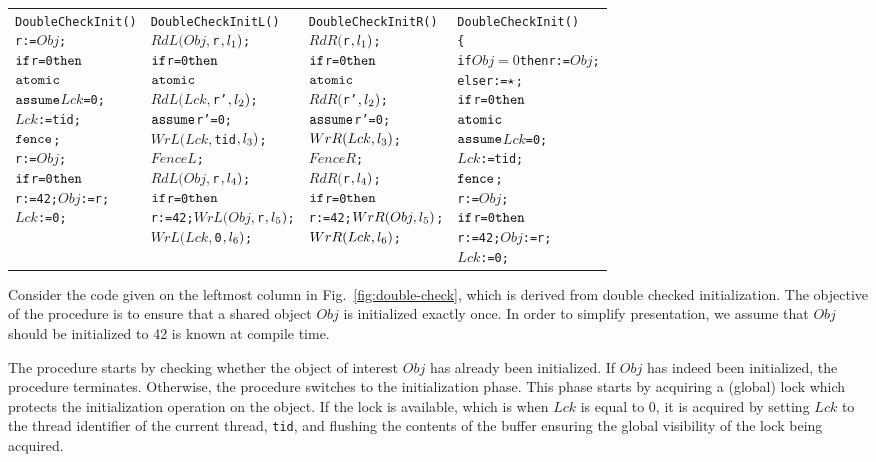 \begin{figure*}[ht]
{\small
\begin{tabular}{p{}|p{}p{}|p{}}
\begin{alltt}DoubleCheckInit() 
 r:=\(Obj\);
 \(\aliif\) r=0 \(\alithen\) 
   \(\aliatomic\)  
     \(\aliassume\) {\(Lck\)=0}; 
     \(Lck\):=tid; 
     \(\alifence\); 
  r:=\(Obj\);
  \(\aliif\) r=0 \(\alithen\) 
    r:=42; \(Obj\):=r;
  \(Lck\):=0;\end{alltt}
&
\begin{alltt}DoubleCheckInitL()
 \(RdL(Obj,\)r\(,l\sb{1})\);
 \(\aliif\) r=0 \(\alithen\) 
   \(\aliatomic\)  
     \(RdL(Lck,\)r'\(,l\sb{2})\); 
     \(\aliassume\) {r'=0}; 
     \(WrL(Lck,\)tid\(,l\sb{3})\); 
     \(FenceL\); 
  \(RdL(Obj,\)r\(,l\sb{4})\);
  \(\aliif\) r=0 \(\alithen\) 
    r:=42; \(WrL(Obj,\)r\(,l\sb{5})\);
  \(WrL(Lck,\)0\(,l\sb{6})\);\end{alltt}
&
\begin{alltt}DoubleCheckInitR()
 \(RdR(\)r\(,l\sb{1})\);
 \(\aliif\) r=0 \(\alithen\) 
   \(\aliatomic\)  
     \(RdR(\)r'\(,l\sb{2})\); 
     \(\aliassume\) {r'=0}; 
     \(WrR(Lck,l\sb{3})\); 
     \(FenceR\); 
  \(RdR(\)r\(,l\sb{4})\);
  \(\aliif\) r=0 \(\alithen\) 
    r:=42; \(WrR(Obj,l\sb{5})\);
  \(WrR(Lck,l\sb{6})\);\end{alltt}
&
\begin{alltt}DoubleCheckInit() 
\{
 if \(Obj=0\) then r:=\(Obj\);
 else r:=\(\alihavocval\);
 \(\aliif\) r=0 \(\alithen\) 
   \(\aliatomic\) 
     \(\aliassume\) {\(Lck\)=0}; 
     \(Lck\):=tid; 
     \(\alifence\);
  r:=\(Obj\);
  \(\aliif\) r=0 \(\alithen\) 
    r:=42; \(Obj\):=r;
  \(Lck\):=0;\end{alltt}
\end{tabular}
}
\caption{The code for double check initialization; its transformed SC-equivalent transformation; abstracted TRF code.}
\label{fig:double-check}
\end{figure*}

Consider the code given on the leftmost column in Fig.~\ref{fig:double-check}, which is derived from double checked initialization.
The objective of the procedure is to ensure that a shared object $Obj$ is initialized exactly once.
In order to simplify presentation, we assume that $Obj$ should be initialized to 42 is known at compile time.

The procedure starts by checking whether the object of interest $Obj$ has already been initialized.
If $Obj$ has indeed been initialized, the procedure terminates.
Otherwise, the procedure switches to the initialization phase.
This phase starts by acquiring a (global) lock which protects the initialization operation on the object.
If the lock is available, which is when $Lck$ is equal to 0, it is acquired by setting $Lck$ to the thread identifier of the current thread, {\tt tid}, and flushing the contents of the buffer ensuring the global visibility of the lock being acquired.

